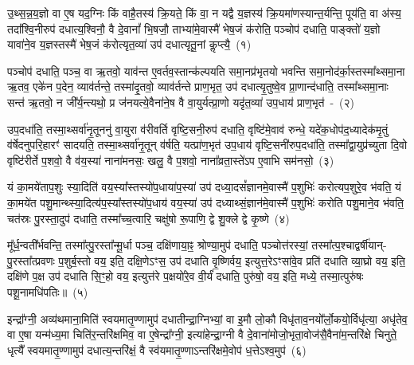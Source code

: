 \setcounter{anuvakam}{0}
उ॒थ्स॒न्न॒य॒ज्ञो वा ए॒ष यद॒ग्निः किं वाहै॒तस्य॑ क्रि॒यते॒ किं वा॒ न यद्वै य॒ज्ञस्य॑ क्रि॒यमा॑णस्यान्त॒र्यन्ति॒ पूय॑ति॒ वा अ॑स्य॒ तदा᳚श्वि॒नीरुप॑ दधात्य॒श्विनौ॒ वै दे॒वानां᳚ भि॒षजौ॒ ताभ्या॑मे॒वास्मै॑ भेष॒जं क॑रोति॒ पञ्चोप॑ दधाति॒ पाङ्क्तो॑ य॒ज्ञो यावा॑ने॒व य॒ज्ञस्तस्मै॑ भेष॒जं क॑रोत्यृत॒व्या॑ उप॑ दधात्यृतू॒नां कॢप्त्यै॒~(१)\ip

पञ्चोप॑ दधाति॒ पञ्च॒ वा ऋ॒तवो॒ याव॑न्त ए॒वर्तव॒स्तान्क॑ल्पयति समा॒नप्र॑भृतयो भवन्ति समा॒नोद॑र्का॒स्तस्मा᳚थ्समा॒ना ऋ॒तव॒ एके॑न प॒देन॒ व्याव॑र्तन्ते॒ तस्मा॑दृ॒तवो॒ व्याव॑र्तन्ते प्राण॒भृत॒ उप॑ दधात्यृ॒तुष्वे॒व प्रा॒णान्द॑धाति॒ तस्मा᳚थ्समा॒नाः सन्त॑ ऋ॒तवो॒ न जी᳚र्य॒न्त्यथो॒ प्र ज॑नयत्ये॒वैना॑ने॒ष वै वा॒युर्यत्प्रा॒णो यदृ॑त॒व्या॑ उप॒धाय॑ प्राण॒भृत॑~-~(२)\ip

उप॒\-दधा॑ति॒ तस्मा॒थ्सर्वा॑नृ॒तूननु॑ वा॒युरा व॑रीवर्ति वृष्टि॒सनी॒रुप॑ दधाति॒ वृष्टि॑मे॒वाव॑ रुन्धे॒ यदे॑क॒धोप॑द॒ध्यादेक॑मृ॒तुं व॑र्\mbox{}षेदनुपरि॒हारꣳ॑ सादयति॒ तस्मा॒थ्सर्वा॑नृ॒तून् व॑र्\mbox{}षति॒ यत्प्रा॑ण॒भृत॑ उप॒धाय॑ वृष्टि॒सनी॑रुप॒\-दधा॑ति॒ तस्मा᳚द्\-वा॒युप्र॑च्युता दि॒वो वृष्टि॑रीर्ते प॒शवो॒ वै व॑य॒स्या॑ नाना॑मनसः॒ खलु॒ वै प॒शवो॒ नाना᳚व्रता॒स्ते॑\-ऽप ए॒वाभि सम॑नसो॒~(३)\ip

यं का॒मये॑ताप॒शुः स्या॒दिति॑ वय॒स्या᳚स्तस्यो॑प॒धाया॑प॒स्या॑ उप॑ दध्या॒दसं᳚ज्ञानमे॒वास्मै॑ प॒शुभिः॑ करोत्यप॒शुरे॒व भ॑वति॒ यं का॒मये॑त पशु॒मान्थ्स्या॒दित्य॑प॒स्या᳚स्तस्यो॑प॒धाय॑ वय॒स्या॑ उप॑ दध्याथ्सं॒ज्ञान॑मे॒वास्मै॑ प॒शुभिः॑ करोति पशु॒माने॒व भ॑वति॒ चत॑स्रः पु॒रस्ता॒दुप॑ दधाति॒ तस्मा᳚च्च॒त्वारि॒ चक्षु॑षो रू॒पाणि॒ द्वे शु॒क्ले द्वे कृ॒ष्णे~(४)\ip

मू᳚र्ध॒न्वती᳚र्भवन्ति॒ तस्मा᳚त्पु॒रस्ता᳚न्मू॒र्धा पञ्च॒ दक्षि॑णाया॒ꣴ॒ श्रोण्या॒मुप॑ दधाति॒ पञ्चोत्त॑रस्यां॒ तस्मा᳚त्प॒श्चाद्वर्\mbox{}षी॑यान्-पु॒रस्ता᳚त्प्रवणः प॒शुर्ब॒स्तो वय॒ इति॒ दक्षि॒णे\-ऽꣳस॒ उप॑ दधाति वृ॒ष्णिर्वय॒ इत्युत्त॒रे\-ऽꣳसा॑वे॒व प्रति॑ दधाति व्या॒घ्रो वय॒ इति॒ दक्षि॑णे प॒क्ष उप॑ दधाति सि॒ꣳ॒हो वय॒ इत्युत्त॑रे प॒क्षयो॑रे॒व वी॒र्यं॑ दधाति॒ पुरु॑षो॒ वय॒ इति॒ मध्ये॒ तस्मा॒त्पुरु॑षः पशू॒नामधि॑\-पतिः॥~(५)\ip

{\anuvakamend[{कॢप्त्या॑ उप॒धाय॑ प्राण॒भृतः॒ सम॑नसः कृ॒ष्णे पुरु॑षो॒ वय॒ इति॒ पञ्च॑ च}]}

इन्द्रा᳚ग्नी॒ अव्य॑थमाना॒मिति॑ स्वयमा\-तृ॒ण्णामुप॑ दधातीन्द्रा॒ग्निभ्यां॒ वा इ॒मौ लो॒कौ विधृ॑ताव॒नयो᳚र्लो॒कयो॒र्विधृ॑त्या॒ अधृ॑तेव॒ वा ए॒षा यन्म॑ध्य॒मा चिति॑र॒न्तरि॑क्षमिव॒ वा ए॒षेन्द्रा᳚ग्नी॒ इत्या॑हेन्द्रा॒ग्नी वै दे॒वाना॑मोजो॒भृता॒वोज॑सै॒वैना॑\-म॒न्तरि॑क्षे चिनुते॒ धृत्यै᳚ स्वयमा\-तृ॒ण्णामुप॑ दधात्य॒न्तरि॑क्षं॒ वै स्व॑यमातृ॒ण्णा\-ऽन्तरि॑क्षमे॒वोप॑ ध॒त्ते\-ऽश्व॒मुप॑~(६)\ip

